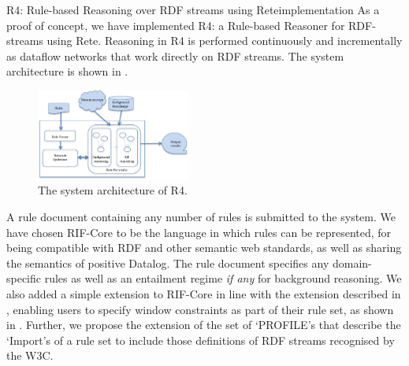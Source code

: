 \begin{nestedsection}{R4: Rule-based Reasoning over RDF streams using Rete}{implementation}
	As a proof of concept, we have implemented R4: a Rule-based Reasoner for RDF-streams using Rete.
	Reasoning in R4 is performed continuously and incrementally as dataflow networks that work directly on RDF streams.
	The system architecture is shown in .
	\begin{figure}[b]
		\centering
		\includegraphics[width=0.45\textwidth]{R4-architecture.png}
		\caption{The system architecture of R4.}
	\end{figure}

	A rule document containing any number of rules is submitted to the system.
	We have chosen RIF-Core to be the language in which rules can be represented, for being compatible with RDF and other semantic web standards, as well as sharing the semantics of positive Datalog.
	The rule document specifies any domain-specific rules as well as an entailment regime \emph{if any} for background reasoning.
	We also added a simple extension to RIF-Core in line with the extension described in , enabling users to specify window constraints as part of their rule set, as shown in .
	Further, we propose the extension of the set of `PROFILE's that describe the `Import's of a rule set to include those definitions of RDF streams recognised by the W3C.


\end{nestedsection}
